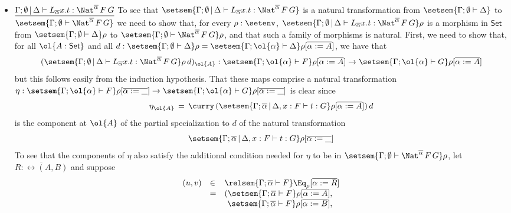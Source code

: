 \documentclass{lmcs}
\theoremstyle{plain}\newtheorem{satz}[thm]{Satz}
\newcommand{\set}{\mathsf{Set}}
\begin{document}
\begin{itemize}
\item $\underline{\Gamma; \emptyset \,|\, \Delta \vdash
  L_{\overline{\alpha}} x.t : \Nat^{\overline{\alpha}} \,F \,G}$ \; To
  see that $\setsem{\Gamma; \emptyset \,|\, \Delta \vdash
    L_{\overline{\alpha}} x.t : \Nat^{\overline{\alpha}} \,F \,G}$ is
  a natural transformation from $\setsem{\Gamma; \emptyset \vdash
    \Delta}$ to $\setsem{\Gamma; \emptyset \vdash
    \Nat^{\overline{\alpha}} \,F \,G}$ we need to show that, for every
  $\rho : \setenv$, $\setsem{\Gamma; \emptyset \,|\, \Delta \vdash
    L_{\overline{\alpha}} x.t : \Nat^{\overline{\alpha}} \,F \,G}\rho$
  is a morphism in $\set$ from $\setsem{\Gamma; \emptyset \vdash
    \Delta}\rho$ to $\setsem{\Gamma; \emptyset \vdash
    \Nat^{\overline{\alpha}} \,F \,G}\rho$, and that such a family of
  morphisms is natural.  First, we need to show that, for all $\ol{A :
    \set}$ and all $d : \setsem{\Gamma; \emptyset \vdash \Delta}\rho =
  \setsem{\Gamma; \ol{\alpha} \vdash \Delta}\rho[\overline{\alpha :=
      A}]$, we have that
\[(\setsem{\Gamma; \emptyset \,|\, \Delta \vdash L_{\overline{\alpha}}
      x.t : \Nat^{\overline{\alpha}} \,F \,G}\rho\,d)_{\ol{A}} :
\setsem{\Gamma; \ol{\alpha} \vdash F}\rho[\overline{\alpha := A}]
    \to \setsem{\Gamma; \ol{\alpha} \vdash G}\rho[\overline{\alpha :=
        A}]\]
but this follows easily from the induction hypothesis.
That these maps comprise a natural transformation $\eta :
\setsem{\Gamma; \ol{\alpha} \vdash F}\rho[\overline{\alpha := \_}] \to
\setsem{\Gamma; \ol{\alpha} \vdash G}\rho[\overline{\alpha := \_}]$ is
clear since \[\eta_{\ol{A}} \, = \, \curry\,
(\setsem{\Gamma; \overline{\alpha} \,|\, \Delta, x : F \vdash t:
  G}\rho[\overline{\alpha := A}])\,d\] is the component at $\ol{A}$ of
the partial specialization to $d$ of the natural transformation
$$\setsem{\Gamma; \overline{\alpha} \,|\, \Delta, x : F \vdash t:
  G}\rho[\overline{\alpha := \_}]$$  To see that the components of
$\eta$ also satisfy the additional condition needed for $\eta$ to
be in $\setsem{\Gamma; \emptyset \vdash \Nat^{\overline{\alpha}} \,F
  \,G}\rho$, let $\overline{R : \rel(A, B)}$ and suppose
\[\begin{array}{lll}
(u, v) &  \in & \relsem{\Gamma;\overline{\alpha} \vdash F}
\Eq_{\rho}[\overline{\alpha := R}]\\
&  = & (\setsem{\Gamma;\overline{\alpha} \vdash F}
\rho[\overline{\alpha := A}], \\ 
  & &\,\,\setsem{\Gamma;\overline{\alpha} \vdash
  F} \rho[\overline{\alpha := B}],

\end{array}\]
\end{itemize}
\end{document}

